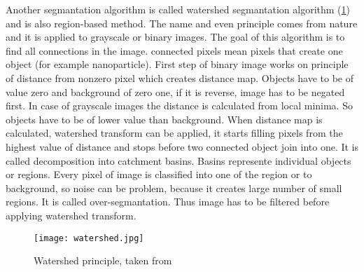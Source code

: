         Another segmantation algorithm is called watershed segmantation algorithm (\ref{fig:watershed}) and is also region-based method. The name and even principle comes from nature and it is applied
        to grayscale or binary images. The goal of this algorithm is to find all connections in the image. connected pixels mean pixels that create one object (for example nanoparticle).
        First step of binary image works on principle of distance from nonzero pixel which creates distance map. Objects have to be of value zero and background of zero one,
        if it is reverse, image has to be negated first. In case of grayscale images the distance is calculated from local minima. So objects have to be of lower value than background.
        When distance map is calculated, watershed transform can be applied, it starts filling pixels from the highest value of distance and stops before two connected object join into one.
        It is called decomposition into catchment basins. Basins represente individual objects or regions. Every pixel of image is classified into one of the region or to background,
        so noise can be problem, because it creates large number of small regions. It is called over-segmantation. Thus image has to be filtered before applying watershed transform.
        \cite{2, 3}
        
        \begin{figure}[h]
            \texttt{[image: watershed.jpg]}
            \caption{Watershed principle, taken from \cite{20}}
            \label{fig:watershed}
        \end{figure}

